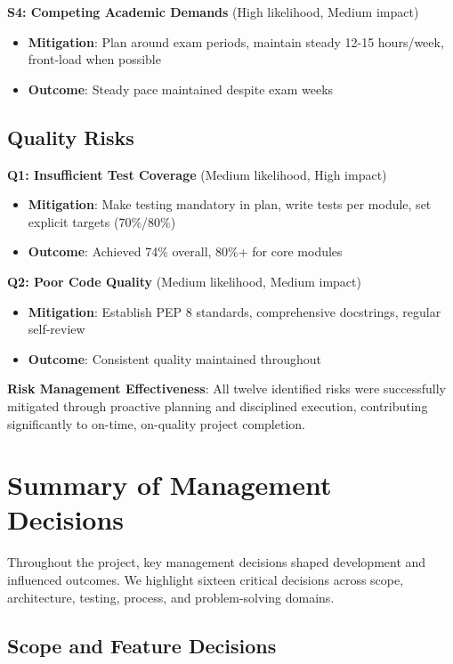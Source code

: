 \documentclass[12pt,a4paper,oneside]{report}
\begin{document}
\textbf{S4: Competing Academic Demands} (High likelihood, Medium impact)
\begin{itemize}
    \item \textbf{Mitigation}: Plan around exam periods, maintain steady 12-15 hours/week, front-load when possible
    \item \textbf{Outcome}: Steady pace maintained despite exam weeks
\end{itemize}

\subsection{Quality Risks}

\textbf{Q1: Insufficient Test Coverage} (Medium likelihood, High impact)
\begin{itemize}
    \item \textbf{Mitigation}: Make testing mandatory in plan, write tests per module, set explicit targets (70\%/80\%)
    \item \textbf{Outcome}: Achieved 74\% overall, 80\%+ for core modules
\end{itemize}

\textbf{Q2: Poor Code Quality} (Medium likelihood, Medium impact)
\begin{itemize}
    \item \textbf{Mitigation}: Establish PEP 8 standards, comprehensive docstrings, regular self-review
    \item \textbf{Outcome}: Consistent quality maintained throughout
\end{itemize}

\textbf{Risk Management Effectiveness}: All twelve identified risks were successfully mitigated through proactive planning and disciplined execution, contributing significantly to on-time, on-quality project completion.

\section{Summary of Management Decisions}
\label{sec:management-decisions}

Throughout the project, key management decisions shaped development and influenced outcomes. We highlight sixteen critical decisions across scope, architecture, testing, process, and problem-solving domains.

\subsection{Scope and Feature Decisions}
\end{document}
